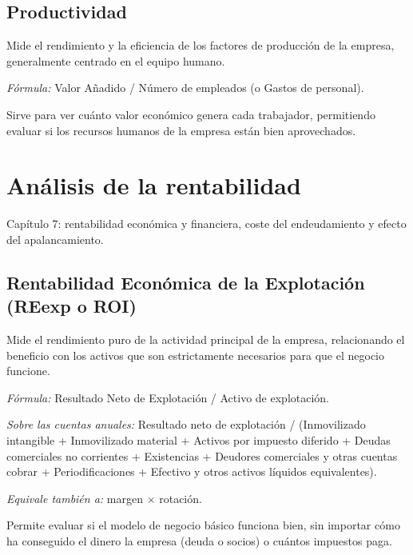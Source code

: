 \documentclass[12pt]{book} %
\begin{document}
\hypertarget{productividad}{%
\subsection{Productividad}\label{productividad}}

Mide el rendimiento y la eficiencia de los factores de producción de la
empresa, generalmente centrado en el equipo humano.

\emph{Fórmula:} Valor Añadido / Número de empleados (o Gastos de
personal).

Sirve para ver cuánto valor económico genera cada trabajador,
permitiendo evaluar si los recursos humanos de la empresa están bien
aprovechados.

\hypertarget{anuxe1lisis-de-la-rentabilidad}{%
\section{Análisis de la
rentabilidad}\label{anuxe1lisis-de-la-rentabilidad}}

Capítulo 7: rentabilidad económica y financiera, coste del endeudamiento
y efecto del apalancamiento.

\hypertarget{rentabilidad-econuxf3mica-de-la-explotaciuxf3n-reexp-o-roi}{%
\subsection{Rentabilidad Económica de la Explotación (REexp o
ROI)}\label{rentabilidad-econuxf3mica-de-la-explotaciuxf3n-reexp-o-roi}}

Mide el rendimiento puro de la actividad principal de la empresa,
relacionando el beneficio con los activos que son estrictamente
necesarios para que el negocio funcione.

\emph{Fórmula:} Resultado Neto de Explotación / Activo de explotación.

\emph{Sobre las cuentas anuales:} Resultado neto de explotación /
(Inmovilizado intangible + Inmovilizado material + Activos por impuesto
diferido + Deudas comerciales no corrientes + Existencias + Deudores
comerciales y otras cuentas cobrar + Periodificaciones + Efectivo y
otros activos líquidos equivalentes).

\emph{Equivale también a:} margen \(\times\) rotación.

Permite evaluar si el modelo de negocio básico funciona bien, sin
importar cómo ha conseguido el dinero la empresa (deuda o socios) o
cuántos impuestos paga.
\end{document}
